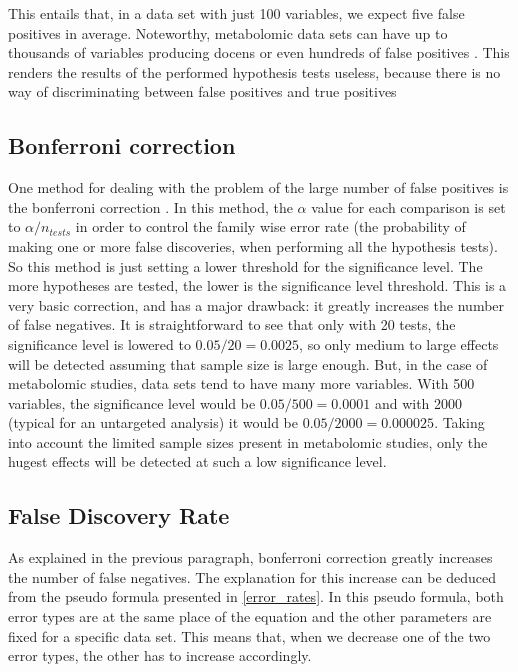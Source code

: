 This entails that, in a data set with just 100 variables, we expect five false positives in average. Noteworthy, metabolomic data sets can have up to thousands of variables producing docens or even hundreds of false positives \parencite{broadhurst2006statistical}. This renders the results of the performed hypothesis tests useless, because there is no way of discriminating between false positives and true positives

\subsection{Bonferroni correction}
One method for dealing with the problem of the large number of false positives is the bonferroni correction \parencite{bland1995multiple}. In this method, the $\alpha$ value for each comparison is set to $\alpha /n_{tests}$ in order to control the family wise error rate (the probability of making one or more false discoveries, when performing all the hypothesis tests). So this method is just setting a lower threshold for the significance level. The more hypotheses are tested, the lower is the significance level threshold. This is a very basic correction, and has a major drawback: it greatly increases the number of false negatives. It is straightforward to see that only with 20 tests, the significance level is lowered to $0.05/20 = 0.0025$, so only medium to large effects will be detected assuming that sample size is large enough. But, in the case of metabolomic studies, data sets tend to have many more variables. With 500 variables, the significance level would be $0.05/500=0.0001$ and with 2000 (typical for an untargeted analysis) it would be $0.05/2000=0.000025$. Taking into account the limited sample sizes present in metabolomic studies, only the hugest effects will be detected at such a low significance level. 

\subsection{False Discovery Rate}
As explained in the previous paragraph, bonferroni correction greatly increases the number of false negatives. The explanation for this increase can be deduced from the pseudo formula presented in \autoref{error_rates}. In this pseudo formula, both error types are at the same place of the equation and the other parameters are fixed for a specific data set. This means that, when we decrease one of the two error types, the other has to increase accordingly.

